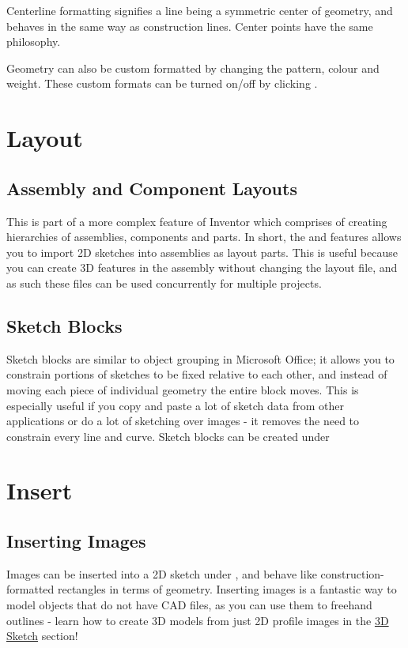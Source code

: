 \begin{enumerate}
Centerline formatting signifies a line being a symmetric center of geometry, and behaves in the same way as construction lines. Center points have the same philosophy.

Geometry can also be custom formatted by changing the pattern, colour and weight. These custom formats can be turned on/off by clicking .

\cbend
\section{Layout}

\subsection{Assembly and Component Layouts}
\cbstart
{}

This is part of a more complex feature of Inventor which comprises of creating hierarchies of assemblies, components and parts. In short, the  and  features allows you to import 2D sketches into assemblies as layout parts. This is useful because you can create 3D features in the assembly without changing the layout file, and as such these files can be used concurrently for multiple projects.

\cbend

\subsection{Sketch Blocks}

\cbstart
{}
Sketch blocks are similar to object grouping in Microsoft Office; it allows you to constrain portions of sketches to be fixed relative to each other, and instead of moving each piece of individual geometry the entire block moves. This is especially useful if you copy and paste a lot of sketch data from other applications or do a lot of sketching over images - it removes the need to constrain every line and curve. Sketch blocks can be created under 

\cbend

\section{Insert}

\subsection{Inserting Images}
\cbstart
{}
Images can be inserted into a 2D sketch under , and behave like construction-formatted rectangles in terms of geometry. Inserting images is a fantastic way to model objects that do not have CAD files, as you can use them to freehand outlines - learn how to create 3D models from just 2D profile images in the \hyperref[section: 3D Sketches]{3D Sketch} section!


\end{enumerate}
